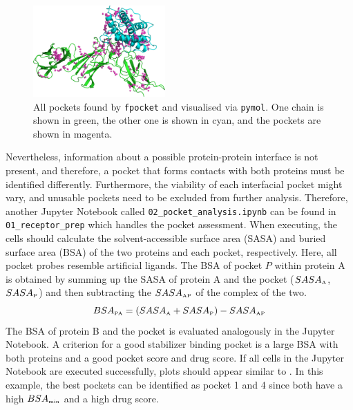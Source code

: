\documentclass[9pt,tutorial]{livecoms}
\newcommand{\code}[1]{\colorbox{light-gray}{\texttt{#1}}}
\begin{document}
\begin{figure}[H]
    \centering
    \includegraphics[width=0.45\textwidth]{figures/fpocket_allpockets.png}
    \caption[All pockets found by \code{fpocket} and visualised via \code{pymol}]{All pockets found by \code{fpocket} and visualised via \code{pymol}. One chain is shown in green, the other one is shown in cyan, and the pockets are shown in magenta.}
    \label{fig:fpocket_allpockets}
\end{figure}
Nevertheless, information about a possible protein-protein interface is not present, and therefore, a pocket that forms contacts with both proteins must be identified differently. Furthermore, the viability of each interfacial pocket might vary, and unusable pockets need to be excluded from further analysis. Therefore, another Jupyter Notebook called \code{02\_pocket\_analysis.ipynb} can be found in \code{01\_receptor\_prep} which handles the pocket assessment. When executing, the cells should calculate the solvent-accessible surface area (SASA) and buried surface area (BSA) of the two proteins and each pocket, respectively. Here, all pocket probes resemble artificial ligands. The BSA of pocket $P$ within protein A is obtained by summing up the SASA of protein A and the pocket ($SASA_\text{\tiny A}$, $SASA_\text{\tiny P}$) and then subtracting the $SASA_\text{\tiny AP}$ of the complex of the two.
\begin{equation}
    BSA_\text{\tiny PA} = (SASA_\text{\tiny A} + SASA_\text{\tiny P}) - SASA_\text{\tiny AP} 
\end{equation}
The BSA of protein B and the pocket is evaluated analogously in the Jupyter Notebook. A criterion for a good stabilizer binding pocket is a large BSA with both proteins and a good pocket score and drug score. If all cells in the Jupyter Notebook are executed successfully, plots should appear similar to . In this example, the best pockets can be identified as pocket 1 and 4 since both have a high $BSA_\text{\tiny min}$ and a high drug score. 
\end{document}
